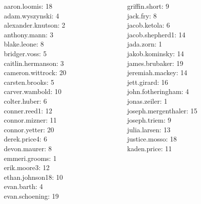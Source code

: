 \documentclass[10pt]{beamer}
\begin{document}
\begin{frame}
\footnotesize 
\vfill 
\begin{columns}
\begin{column}{0.33\textwidth}
aaron.loomis: 18 \\ 
adam.wyszynski: 4 \\ 
alexander.knutson: 2 \\ 
anthony.mann: 3 \\ 
blake.leone: 8 \\ 
bridger.voss: 5 \\ 
caitlin.hermanson: 3 \\ 
cameron.wittrock: 20 \\ 
carsten.brooks: 5 \\ 
carver.wambold: 10 \\ 
colter.huber: 6 \\ 
conner.reed1: 12 \\ 
connor.mizner: 11 \\ 
connor.yetter: 20 \\ 
derek.price4: 6 \\ 
devon.maurer: 8 \\ 
emmeri.grooms: 1 \\ 
erik.moore3: 12 \\ 
ethan.johnson18: 10 \\ 
evan.barth: 4 \\ 
evan.schoening: 19 \\\end{column}
\begin{column}{0.33\textwidth}
griffin.short: 9 \\ 
jack.fry: 8 \\ 
jacob.ketola: 6 \\ 
jacob.shepherd1: 14 \\ 
jada.zorn: 1 \\ 
jakob.kominsky: 14 \\ 
james.brubaker: 19 \\ 
jeremiah.mackey: 14 \\ 
jett.girard: 16 \\ 
john.fotheringham: 4 \\ 
jonas.zeiler: 1 \\ 
joseph.mergenthaler: 15 \\ 
joseph.triem: 9 \\ 
julia.larsen: 13 \\ 
justice.mosso: 18 \\ 
kaden.price: 11 \\ 

\end{column}
\end{columns}
\end{frame}
\end{document}
